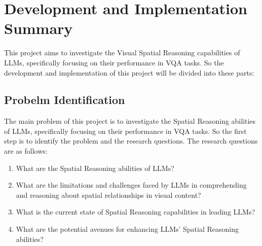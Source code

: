 \documentclass[journal,10pt]{IEEEtran}
\begin{document}
\section{Development and Implementation Summary}
This project aims to investigate the Visual Spatial Reasoning capabilities of LLMs, specifically focusing on their performance in VQA tasks. So the development and implementation of this project will be divided into these parts:

\subsection{Probelm Identification}
The main problem of this project is to investigate the Spatial Reasoning abilities of LLMs, specifically focusing on their performance in VQA tasks. So the first step is to identify the problem and the research questions. The research questions are as follows:
\begin{enumerate}
    \item What are the Spatial Reasoning abilities of LLMs?
    \item What are the limitations and challenges faced by LLMs in comprehending and reasoning about spatial relationships in visual content?
    \item What is the current state of Spatial Reasoning capabilities in leading LLMs?
    \item What are the potential avenues for enhancing LLMs' Spatial Reasoning abilities?
\end{enumerate}
\end{document}
